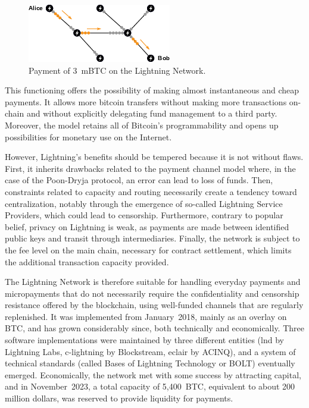 \documentclass[
  a5paper,
  smalldemyvopaper,10pt,twoside,onecolumn,openright,extrafontsizes,hidelinks]{memoir}
\begin{document}
\begin{figure}

{\centering \includegraphics{chapters/img/lightning-network-abacus.png}

}

\caption{Payment of 3~mBTC on the Lightning Network.}

\end{figure}%

This functioning offers the possibility of making almost instantaneous
and cheap payments. It allows more bitcoin transfers without making more
transactions on-chain and without explicitly delegating fund management
to a third party. Moreover, the model retains all of Bitcoin's
programmability and opens up possibilities for monetary use on the
Internet.

However, Lightning's benefits should be tempered because it is not
without flaws. First, it inherits drawbacks related to the payment
channel model where, in the case of the Poon-Dryja protocol, an error
can lead to loss of funds. Then, constraints related to capacity and
routing necessarily create a tendency toward centralization, notably
through the emergence of so-called Lightning Service Providers, which
could lead to censorship. Furthermore, contrary to popular belief,
privacy on Lightning is weak, as payments are made between identified
public keys and transit through intermediaries. Finally, the network is
subject to the fee level on the main chain, necessary for contract
settlement, which limits the additional transaction capacity provided.

The Lightning Network is therefore suitable for handling everyday
payments and micropayments that do not necessarily require the
confidentiality and censorship resistance offered by the blockchain,
using well-funded channels that are regularly replenished. It was
implemented from January~2018, mainly as an overlay on BTC, and has
grown considerably since, both technically and economically. Three
software implementations were maintained by three different entities
(lnd by Lightning Labs, c-lightning by Blockstream, eclair by ACINQ),
and a system of technical standards (called Bases of Lightning
Technology or BOLT) eventually emerged. Economically, the network met
with some success by attracting capital, and in November~2023, a total
capacity of 5,400~BTC, equivalent to about 200 million dollars, was
reserved to provide liquidity for payments.
\end{document}
